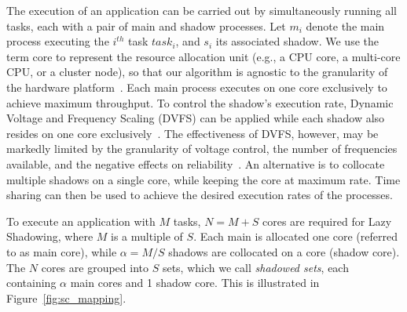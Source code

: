 The execution of an application can be carried out by simultaneously running all tasks, each with a pair of main and shadow processes. Let $m_i$ denote the main process executing the $i^{th}$ task $task_i$, and $s_i$ its associated shadow.
We use the term core to represent the resource allocation unit (e.g., a
CPU core, a multi-core CPU, or a cluster node), so that our algorithm is agnostic to the
granularity of the hardware platform~\cite{casanova_inria_2012}. Each main process executes on one core exclusively to achieve maximum throughput.  
To control the shadow's execution rate, Dynamic Voltage and Frequency Scaling (DVFS) can be applied while each shadow also resides on one core exclusively~\cite{mills_2014_icnc,cui_en7085151,cui_2014_closer}. 
The effectiveness of DVFS, however, may be markedly 
limited by the granularity of voltage control, the number of frequencies available, and the negative effects on 
reliability~\cite{chandra2008defect}.
An alternative is to collocate multiple shadows on a single core, while keeping the core at maximum rate. Time sharing can then be used to achieve the desired execution rates of the processes. %



To execute an application with $M$ tasks, $N=M+S$ cores are required for Lazy Shadowing, where $M$ is a multiple of $S$. Each main is allocated one core (referred to as main core), while $\alpha=M/S$ shadows are collocated on a core (shadow core). 
The $N$ cores are grouped into $S$ sets, which we call \emph{shadowed sets}, each containing $\alpha$ main cores and 1 shadow core.
This is illustrated in Figure~\ref{fig:sc_mapping}.  

